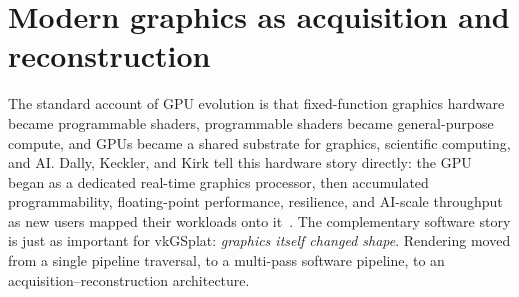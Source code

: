 \documentclass[10pt,journal,onecolumn]{IEEEtran}
\begin{document}
\section{Modern graphics as acquisition and reconstruction}
\label{sec:acqrec}

The standard account of GPU evolution is that fixed-function graphics
hardware became programmable shaders, programmable shaders became
general-purpose compute, and GPUs became a shared substrate for
graphics, scientific computing, and AI. Dally, Keckler, and Kirk tell
this hardware story directly: the GPU began as a dedicated real-time
graphics processor, then accumulated programmability, floating-point
performance, resilience, and AI-scale throughput as new users mapped
their workloads onto it~\cite{dally2021gpu}. The complementary software
story is just as important for vkGSplat: \emph{graphics itself changed
shape}. Rendering moved from a single pipeline traversal, to a
multi-pass software pipeline, to an acquisition--reconstruction
architecture.
\end{document}
